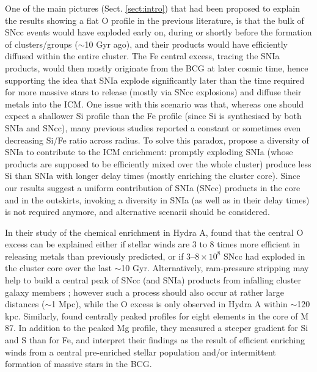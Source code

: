 \documentclass{aa}
\begin{document}
One of the main pictures (Sect. \ref{sect:intro}) that had been proposed to explain the results showing a flat O profile in the previous literature, is that the bulk of SNcc events would have exploded early on, during or shortly before the formation of clusters/groups ($\sim$10 Gyr ago), and their products would have efficiently diffused within the entire cluster. The Fe central excess, tracing the SNIa products, would then mostly originate from the BCG at later cosmic time, hence supporting the idea that SNIa explode significantly later than the time required for more massive stars to release (mostly via SNcc explosions) and diffuse their metals into the ICM. One issue with this scenario was that, whereas one should expect a shallower Si profile than the Fe profile (since Si is synthesised by both SNIa and SNcc), many previous studies reported a constant \citep[e.g.][]{2006MNRAS.371.1483S,2008PASJ...60S.333S} or sometimes even decreasing \citep{2011MNRAS.418.2744M} Si/Fe ratio across radius. To solve this paradox, \citet{2002A&A...381...21F} propose a diversity of SNIa to contribute to the ICM enrichment: promptly exploding SNIa (whose products are supposed to be efficiently mixed over the whole cluster) produce less Si than SNIa with longer delay times (mostly enriching the cluster core). 
Since our results suggest a uniform contribution of SNIa (SNcc) products in the core and in the outskirts, invoking a diversity in SNIa (as well as in their delay times) is not required anymore, and alternative scenarii should be considered.

In their study of the chemical enrichment in Hydra A, \citet{2009A&A...493..409S} found that the central O excess can be explained either if stellar winds are 3 to 8 times more efficient in releasing metals than previously predicted, or if 3--$8 \times 10^{8}$ SNcc had exploded in the cluster core over the last $\sim$10 Gyr. Alternatively, ram-pressure stripping may help to build a central peak of SNcc (and SNIa) products from infalling cluster galaxy members \citep{2006A&A...452..795D}; however such a process should also occur at rather large distances ($\sim$1 Mpc), while the O excess is only observed in Hydra A within $\sim$120 kpc. Similarly, \citet{2011MNRAS.418.2744M} found centrally peaked profiles for eight elements in the core of M\,87. In addition to the peaked Mg profile, they measured a steeper gradient for Si and S than for Fe, and interpret their findings as the result of efficient enriching winds from a central pre-enriched stellar population and/or intermittent formation of massive stars in the BCG.
\end{document}
